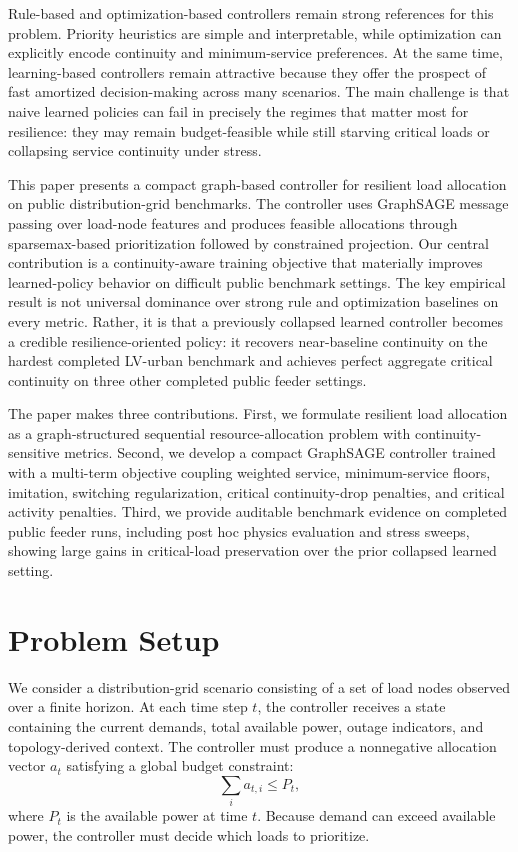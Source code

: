 \documentclass[11pt]{article}
\begin{document}
Rule-based and optimization-based controllers remain strong references for this problem. Priority heuristics are simple and interpretable, while optimization can explicitly encode continuity and minimum-service preferences. At the same time, learning-based controllers remain attractive because they offer the prospect of fast amortized decision-making across many scenarios. The main challenge is that naive learned policies can fail in precisely the regimes that matter most for resilience: they may remain budget-feasible while still starving critical loads or collapsing service continuity under stress.

This paper presents a compact graph-based controller for resilient load allocation on public distribution-grid benchmarks. The controller uses GraphSAGE message passing over load-node features and produces feasible allocations through sparsemax-based prioritization followed by constrained projection. Our central contribution is a continuity-aware training objective that materially improves learned-policy behavior on difficult public benchmark settings. The key empirical result is not universal dominance over strong rule and optimization baselines on every metric. Rather, it is that a previously collapsed learned controller becomes a credible resilience-oriented policy: it recovers near-baseline continuity on the hardest completed LV-urban benchmark and achieves perfect aggregate critical continuity on three other completed public feeder settings.

The paper makes three contributions. First, we formulate resilient load allocation as a graph-structured sequential resource-allocation problem with continuity-sensitive metrics. Second, we develop a compact GraphSAGE controller trained with a multi-term objective coupling weighted service, minimum-service floors, imitation, switching regularization, critical continuity-drop penalties, and critical activity penalties. Third, we provide auditable benchmark evidence on completed public feeder runs, including post hoc physics evaluation and stress sweeps, showing large gains in critical-load preservation over the prior collapsed learned setting.

\section{Problem Setup}

We consider a distribution-grid scenario consisting of a set of load nodes observed over a finite horizon. At each time step $t$, the controller receives a state containing the current demands, total available power, outage indicators, and topology-derived context. The controller must produce a nonnegative allocation vector $a_t$ satisfying a global budget constraint:
\begin{equation}
\sum_i a_{t,i} \le P_t,
\end{equation}
where $P_t$ is the available power at time $t$. Because demand can exceed available power, the controller must decide which loads to prioritize.
\end{document}

